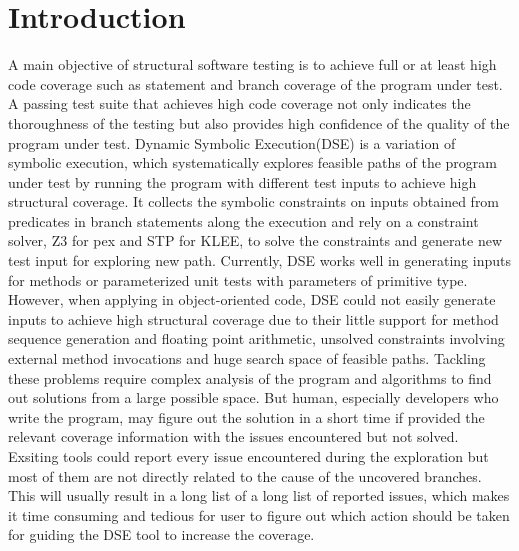 \section{Introduction}
A main objective of structural software testing is to achieve full or at least high code coverage such as statement and branch coverage of the program under test. A passing test suite that achieves high code coverage not only indicates the thoroughness of the testing but also provides high confidence of the quality of the program under test. Dynamic Symbolic Execution(DSE) is a variation of symbolic execution, which systematically explores feasible paths of the program under test by running the program with different test inputs to achieve high structural coverage. It collects the symbolic constraints on inputs obtained from predicates in branch statements along the execution and rely on a constraint solver, Z3 for pex and STP for KLEE, to solve the constraints and generate new test input for exploring new path. Currently, DSE works well in generating inputs for methods or parameterized unit tests with parameters of primitive type. However, when applying in  object-oriented code, DSE could not easily generate inputs to achieve high structural coverage due to their little support for method sequence generation and floating point arithmetic, unsolved constraints involving external method invocations and huge search space of feasible paths. Tackling these problems require complex analysis of the program and algorithms to find out solutions from a large possible space. But human, especially developers who write the program, may figure out the solution in a short time if provided the relevant coverage information with the issues encountered but not solved. Exsiting tools could report every issue encountered during the exploration but most of them are not directly related to the cause of the uncovered branches. This will usually result in a long list of a long list of reported issues, which makes it time consuming and tedious for user to figure out which action should be taken for guiding the DSE tool to increase the coverage.

